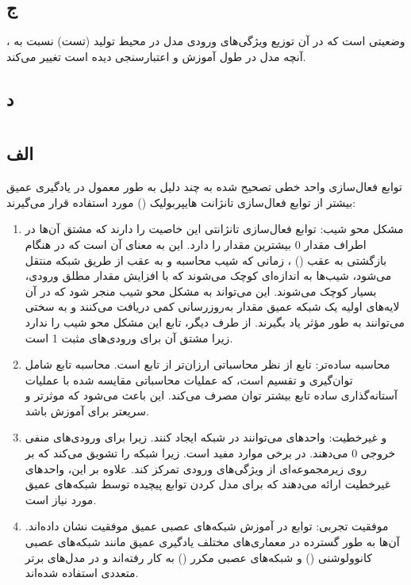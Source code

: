 \documentclass{article}
\begin{document}
\subsection{ج}
، وضعیتی است که در آن توزیع ویژگی‌های ورودی مدل در محیط تولید (تست) نسبت به آنچه مدل در طول آموزش و اعتبارسنجی دیده است تغییر می‌کند.
\subsection{د}




\newpage




\section{}
\subsection{الف}

توابع فعال‌سازی واحد خطی تصحیح شده  به چند دلیل به طور معمول در یادگیری عمیق بیشتر از توابع فعال‌سازی تانژانت هایپربولیک () مورد استفاده قرار می‌گیرند:
\begin{enumerate}
\item مشکل محو شیب: توابع فعال‌سازی تانژانتی این خاصیت را دارند که مشتق آن‌ها در اطراف مقدار 0 بیشترین مقدار را دارد. این به معنای آن است که در هنگام بازگشتی به عقب () ، زمانی که شیب محاسبه و به عقب از طریق شبکه منتقل می‌شود، شیب‌ها به اندازه‌ای کوچک می‌شوند که با افزایش مقدار مطلق ورودی، بسیار کوچک می‌شوند. این می‌تواند به مشکل محو شیب  منجر شود که در آن لایه‌های اولیه یک شبکه عمیق مقدار به‌روزرسانی کمی دریافت می‌کنند و به سختی می‌توانند به طور مؤثر یاد بگیرند. از طرف دیگر، تابع  این مشکل محو شیب را ندارد زیرا مشتق آن برای ورودی‌های مثبت 1 است.

\item محاسبه ساده‌تر: تابع  از نظر محاسباتی ارزان‌تر از تابع  است. محاسبه تابع  شامل توان‌گیری و تقسیم است، که عملیات محاسباتی مقایسه شده با عملیات آستانه‌گذاری ساده تابع  بیشتر توان مصرف می‌کند. این باعث می‌شود که  موثرتر و سریعتر برای آموزش باشد.

\item {} و غیرخطیت: واحدهای  می‌توانند  در شبکه ایجاد کنند. زیرا برای ورودی‌های منفی خروجی 0 می‌دهند.  در برخی موارد مفید است. زیرا شبکه را تشویق می‌کند که بر روی زیرمجموعه‌ای از ویژگی‌های ورودی تمرکز کند. علاوه بر این، واحدهای  غیرخطیت ارائه می‌دهند که برای مدل کردن توابع پیچیده توسط شبکه‌های عمیق مورد نیاز است.

\item موفقیت تجربی: توابع  در آموزش شبکه‌های عصبی عمیق موفقیت نشان داده‌اند. آن‌ها به طور گسترده در معماری‌های مختلف یادگیری عمیق مانند شبکه‌های عصبی کانوولوشنی () و شبکه‌های عصبی مکرر () به کار رفته‌اند و در مدل‌های برتر متعددی استفاده شده‌اند.
\end{enumerate}
\end{document}
